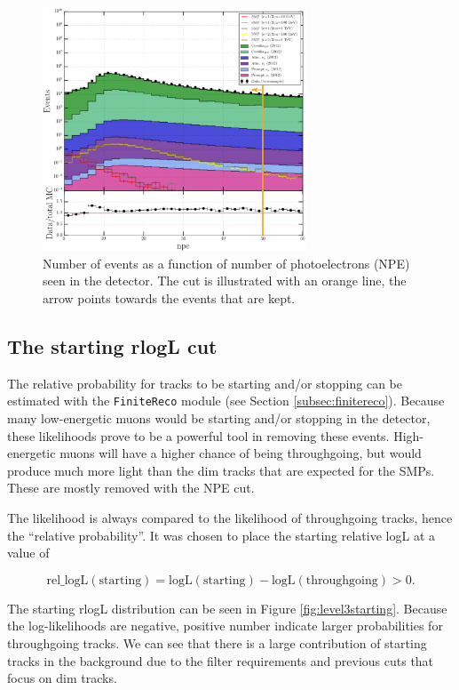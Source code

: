 \begin{figure}[t]
\centering
\includegraphics[width=0.7\textwidth]{chapter8/img/L3_zenithcut_gr_1p4835298642_rloglcut_less_15_1D_stack_npe_new.png}
\caption{Number of events as a function of number of photoelectrons (NPE) seen in the detector. The cut is illustrated with an orange line, the arrow points towards the events that are kept.}
\label{fig:level3npe}
\end{figure}

\subsection{The starting rlogL cut}
The relative probability for tracks to be starting and/or stopping can be estimated with the \texttt{FiniteReco} module (see Section \ref{subsec:finitereco}). Because many low-energetic muons would be starting and/or stopping in the detector, these likelihoods prove to be a powerful tool in removing these events. High-energetic muons will have a higher chance of being throughgoing, but would produce much more light than the dim tracks that are expected for the SMPs. These are mostly removed with the NPE cut.

The likelihood is always compared to the likelihood of throughgoing tracks, hence the ``relative probability''. It was chosen to place the starting relative logL at a value of 

\begin{equation}
\textrm{rel\_logL}(\textrm{starting}) = \textrm{logL}(\textrm{starting}) - \textrm{logL}(\textrm{throughgoing}) > 0. 
\end{equation}

The starting rlogL distribution can be seen in Figure \ref{fig:level3starting}. Because the log-likelihoods are negative, positive number indicate larger probabilities for throughgoing tracks. We can see that there is a large contribution of starting tracks in the background due to the filter requirements and previous cuts that focus on dim tracks.

